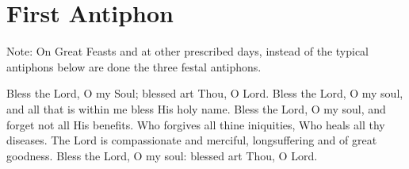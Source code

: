 \section{First Antiphon}

\begin{rubricmed}
    Note: On Great Feasts and at other prescribed days, instead of the typical antiphons below are done the three festal antiphons.
\end{rubricmed}

\begin{liturgicaltext}
    \choir Bless the Lord, O my Soul; blessed art Thou, O Lord. Bless the Lord, O my soul, and all that is within me bless His holy name. Bless the Lord, O my soul, and forget not all His benefits. Who forgives all thine iniquities, Who heals all thy diseases. The Lord is compassionate and merciful, longsuffering and of great goodness. Bless the Lord, O my soul: blessed art Thou, O Lord.
\end{liturgicaltext}